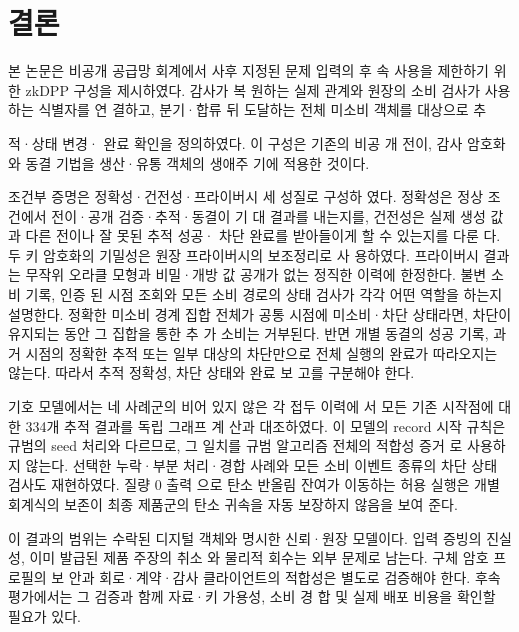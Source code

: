 \section{결론}
본 논문은 비공개 공급망 회계에서 사후 지정된 문제 입력의 후
속 사용을 제한하기 위한 zkDPP 구성을 제시하였다. 감사가 복
원하는 실제 관계와 원장의 소비 검사가 사용하는 식별자를 연
결하고, 분기·합류 뒤 도달하는 전체 미소비 객체를 대상으로 추

적·상태 변경· 완료 확인을 정의하였다. 이 구성은 기존의 비공
개 전이, 감사 암호화와 동결 기법을 생산·유통 객체의 생애주
기에 적용한 것이다.

조건부 증명은 정확성·건전성·프라이버시 세 성질로 구성하
였다. 정확성은 정상 조건에서 전이·공개 검증·추적·동결이 기
대 결과를 내는지를, 건전성은 실제 생성 값과 다른 전이나 잘
못된 추적 성공· 차단 완료를 받아들이게 할 수 있는지를 다룬
다. 두 키 암호화의 기밀성은 원장 프라이버시의 보조정리로 사
용하였다. 프라이버시 결과는 무작위 오라클 모형과 비밀·개방
값 공개가 없는 정직한 이력에 한정한다. 불변 소비 기록, 인증
된 시점 조회와 모든 소비 경로의 상태 검사가 각각 어떤 역할을
하는지 설명한다. 정확한 미소비 경계 집합 전체가 공통 시점에
미소비·차단 상태라면, 차단이 유지되는 동안 그 집합을 통한 추
가 소비는 거부된다. 반면 개별 동결의 성공 기록, 과거 시점의
정확한 추적 또는 일부 대상의 차단만으로 전체 실행의 완료가
따라오지는 않는다. 따라서 추적 정확성, 차단 상태와 완료 보
고를 구분해야 한다.

기호 모델에서는 네 사례군의 비어 있지 않은 각 접두 이력에
서 모든 기존 시작점에 대한 334개 추적 결과를 독립 그래프 계
산과 대조하였다. 이 모델의 record 시작 규칙은 규범의 seed
처리와 다르므로, 그 일치를 규범 알고리즘 전체의 적합성 증거
로 사용하지 않는다. 선택한 누락·부분 처리·경합 사례와 모든
소비 이벤트 종류의 차단 상태 검사도 재현하였다. 질량 0 출력
으로 탄소 반올림 잔여가 이동하는 허용 실행은 개별 회계식의
보존이 최종 제품군의 탄소 귀속을 자동 보장하지 않음을 보여
준다.

이 결과의 범위는 수락된 디지털 객체와 명시한 신뢰·원장
모델이다. 입력 증빙의 진실성, 이미 발급된 제품 주장의 취소
와 물리적 회수는 외부 문제로 남는다. 구체 암호 프로필의 보
안과 회로·계약·감사 클라이언트의 적합성은 별도로 검증해야
한다. 후속 평가에서는 그 검증과 함께 자료·키 가용성, 소비 경
합 및 실제 배포 비용을 확인할 필요가 있다.
